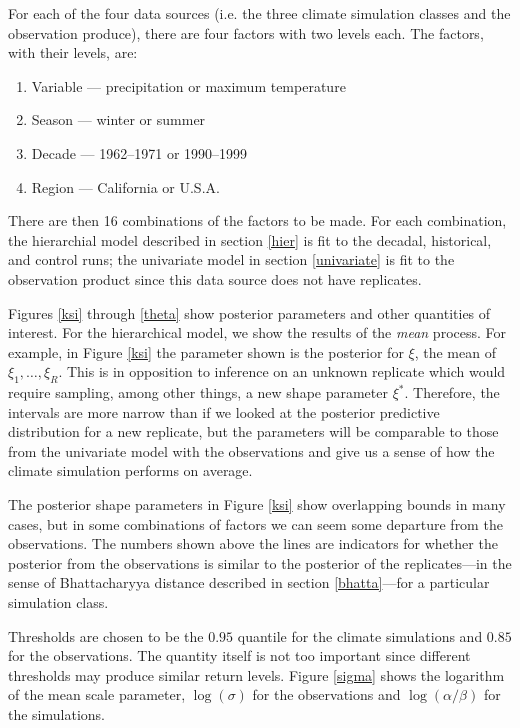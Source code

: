 \documentclass[12pt]{article}
\begin{document}
For each of the four data sources (i.e. the three climate simulation classes and the observation produce), there are four factors with two levels each. The factors, with their levels, are:
\begin{enumerate}
\item Variable --- precipitation or maximum temperature
\item Season --- winter or summer
\item Decade --- 1962--1971 or 1990--1999
\item Region --- California or U.S.A.
\end{enumerate}
There are then 16 combinations of the factors to be made. For each combination, the hierarchial model described in section \ref{hier} is fit to the decadal, historical, and control runs; the univariate model in section \ref{univariate} is fit to the observation product since this data source does not have replicates.

Figures \ref{ksi} through \ref{theta} show posterior parameters and other quantities of interest. For the hierarchical model, we show the results of the \emph{mean} process. For example, in Figure \ref{ksi} the parameter shown is the posterior for $\xi$, the mean of $\xi_1,\ldots,\xi_R$. This is in opposition to inference on an unknown replicate which would require sampling, among other things, a new shape parameter $\xi^*$. Therefore, the intervals are more narrow than if we looked at the posterior predictive distribution for a new replicate, but the parameters will be comparable to those from the univariate model with the observations and give us a sense of how the climate simulation performs on average.

The posterior shape parameters in Figure \ref{ksi} show overlapping bounds in many cases, but in some combinations of factors we can seem some departure from the observations. The numbers shown above the lines are indicators for whether the posterior from the observations is similar to the posterior of the replicates---in the sense of Bhattacharyya distance described in section \ref{bhatta}---for a particular simulation class.

Thresholds are chosen to be the $0.95$ quantile for the climate simulations and $0.85$ for the observations. The quantity itself is not too important since different thresholds may produce similar return levels. Figure \ref{sigma} shows the logarithm of the mean scale parameter, $\log(\sigma)$ for the observations and $\log(\alpha/\beta)$ for the simulations.
\end{document}
